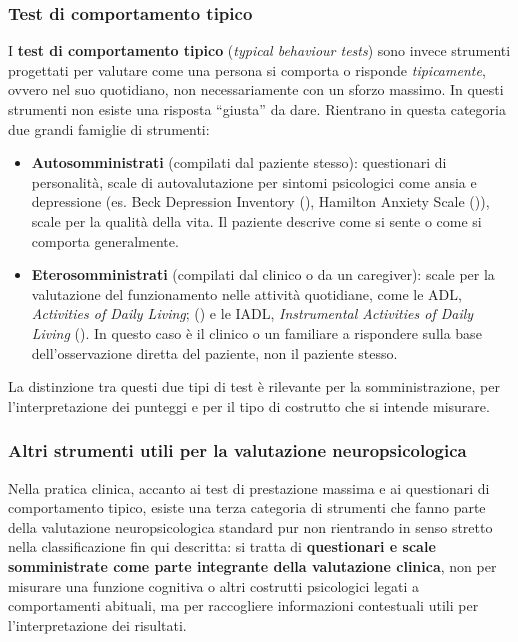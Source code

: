 \documentclass[
  italian,
  letterpaper,
  paper=6in:9in,
  pagesize=pdftex,
  headinclude=on,
  footinclude=on,
  11pt]{scrbook}
\providecommand{\tightlist}{%
  \setlength{\itemsep}{0pt}\setlength{\parskip}{0pt}}
\begin{document}
\subsubsection{Test di comportamento
tipico}\label{test-di-comportamento-tipico}

I \textbf{test di comportamento tipico} (\emph{typical behaviour tests})
sono invece strumenti progettati per valutare come una persona si
comporta o risponde \emph{tipicamente}, ovvero nel suo quotidiano, non
necessariamente con un sforzo massimo. In questi strumenti non esiste
una risposta ``giusta'' da dare. Rientrano in questa categoria due
grandi famiglie di strumenti:

\begin{itemize}
\tightlist
\item
  \textbf{Autosomministrati} (compilati dal paziente stesso):
  questionari di personalità, scale di autovalutazione per sintomi
  psicologici come ansia e depressione (es. Beck Depression Inventory
  (\cite{beck1961inventory}), Hamilton Anxiety Scale
  (\cite{hamilton1959assessment})), scale per la qualità della vita. Il
  paziente descrive come si sente o come si comporta generalmente.
\item
  \textbf{Eterosomministrati} (compilati dal clinico o da un caregiver):
  scale per la valutazione del funzionamento nelle attività quotidiane,
  come le ADL, \emph{Activities of Daily Living};
  (\cite{katz1963studies}) e le IADL, \emph{Instrumental Activities of
  Daily Living} (\cite{lawton1969assessment}). In questo caso è il
  clinico o un familiare a rispondere sulla base dell'osservazione
  diretta del paziente, non il paziente stesso.
\end{itemize}

La distinzione tra questi due tipi di test è rilevante per la
somministrazione, per l'interpretazione dei punteggi e per il tipo di
costrutto che si intende misurare.

\subsubsection{Altri strumenti utili per la valutazione
neuropsicologica}\label{altri-strumenti-utili-per-la-valutazione-neuropsicologica}

Nella pratica clinica, accanto ai test di prestazione massima e ai
questionari di comportamento tipico, esiste una terza categoria di
strumenti che fanno parte della valutazione neuropsicologica standard
pur non rientrando in senso stretto nella classificazione fin qui
descritta: si tratta di \textbf{questionari e scale somministrate come
parte integrante della valutazione clinica}, non per misurare una
funzione cognitiva o altri costrutti psicologici legati a comportamenti
abituali, ma per raccogliere informazioni contestuali utili per
l'interpretazione dei risultati.
\end{document}
